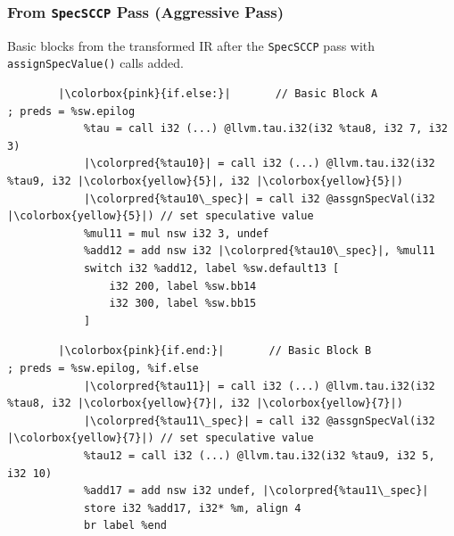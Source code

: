 \documentclass[aspectratio=169, compress]{beamer}
\newcommand{\colorpred}[1]{\colorbox{green}{#1}}
\begin{document}
\begin{frame}[fragile]
	\frametitle{From \texttt{SpecSCCP} Pass (Aggressive Pass)}
	Basic blocks from the transformed IR after the \texttt{SpecSCCP} pass with \texttt{assignSpecValue()} calls added.
	\begin{verbatim}
		|\colorbox{pink}{if.else:}|       // Basic Block A             		; preds = %sw.epilog
			%tau = call i32 (...) @llvm.tau.i32(i32 %tau8, i32 7, i32 3)
			|\colorpred{%tau10}| = call i32 (...) @llvm.tau.i32(i32 %tau9, i32 |\colorbox{yellow}{5}|, i32 |\colorbox{yellow}{5}|)	
			|\colorpred{%tau10\_spec}| = call i32 @assgnSpecVal(i32 |\colorbox{yellow}{5}|) // set speculative value
			%mul11 = mul nsw i32 3, undef
			%add12 = add nsw i32 |\colorpred{%tau10\_spec}|, %mul11
			switch i32 %add12, label %sw.default13 [
				i32 200, label %sw.bb14
				i32 300, label %sw.bb15
			]
	\end{verbatim}
	\begin{verbatim}
		|\colorbox{pink}{if.end:}|       // Basic Block B	   		     ; preds = %sw.epilog, %if.else
			|\colorpred{%tau11}| = call i32 (...) @llvm.tau.i32(i32 %tau8, i32 |\colorbox{yellow}{7}|, i32 |\colorbox{yellow}{7}|)
			|\colorpred{%tau11\_spec}| = call i32 @assgnSpecVal(i32 |\colorbox{yellow}{7}|) // set speculative value
			%tau12 = call i32 (...) @llvm.tau.i32(i32 %tau9, i32 5, i32 10)
			%add17 = add nsw i32 undef, |\colorpred{%tau11\_spec}|
			store i32 %add17, i32* %m, align 4
			br label %end
	\end{verbatim}
\end{frame}
\end{document}

